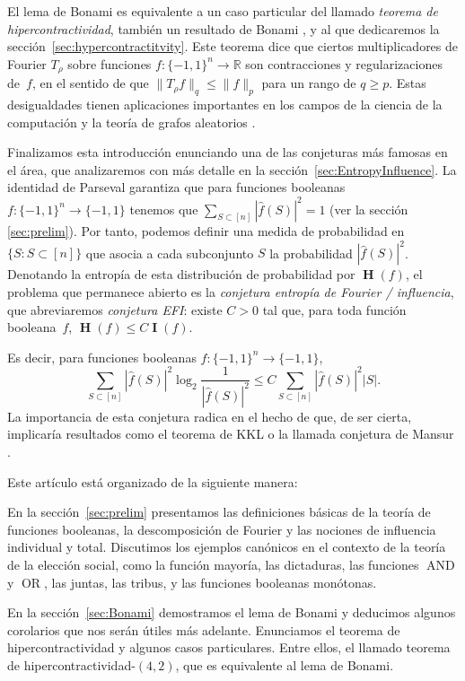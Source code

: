 \documentclass[autocontact]{gaceta}
\newcommand{\R}{\mathbb{R}}
\DeclareMathOperator{\II}{\mathbf{I}}
\DeclareMathOperator{\HH}{\mathbf{H}}
\DeclareMathOperator{\AND}{AND}
\DeclareMathOperator{\OR}{OR}
\begin{document}
El lema de Bonami es equivalente a un caso particular del llamado \emph{teorema de hipercontractividad}, también un resultado de Bonami \cite[capítulo III, teorema~3]{Bon70}, y al que dedicaremos la sección~\ref{sec:hypercontractitvity}. Este teorema dice que ciertos multiplicadores de Fourier $T_\rho$ sobre funciones $f:\{-1,1\}^n\to\R$ son contracciones y regularizaciones de~$f$, en el sentido de que $\|T_{\rho} f\|_q\leq \|f\|_p$ para un rango de $q\geq p$. Estas desigualdades tienen aplicaciones importantes en los campos de la ciencia de la computación y la teoría de grafos aleatorios \cite{KaS05}.

Finalizamos esta introducción enunciando una de las conjeturas más famosas en el área, que analizaremos con más detalle en la sección~\ref{sec:EntropyInfluence}. La identidad de Parseval garantiza que para funciones booleanas $f:\{-1,1\}^n\to \{-1,1\}$ tenemos que $\sum_{S\subset [n]} |\widehat{f}(S)|^2=1$ (ver la sección \ref{sec:prelim}). Por tanto, podemos definir una medida de probabilidad en $\{S:S\subset [n]\}$ que asocia a cada subconjunto $S$ la probabilidad $|\widehat{f}(S)|^2$. Denotando la entropía de esta distribución de probabilidad por $\HH(f)$, el problema que permanece abierto es la \emph{conjetura entropía de Fourier / influencia}, que abreviaremos \emph{conjetura EFI}: existe $C>0$ tal que, para toda función booleana~$f$, $\HH(f)\leq C \II(f)$.

Es decir, para funciones booleanas $f:\{-1,1\}^n\to\{-1,1\}$,
\[
\sum_{S\subset [n]} |\widehat{f}(S)|^2\log_2 \frac{1}{|\widehat{f}(S)|^2}
\leq C \sum_{S\subset [n]} |\widehat{f}(S)|^2|S|.
\]
La importancia de esta conjetura radica en el hecho de que, de ser cierta, implicaría resultados como el teorema de KKL o la llamada conjetura de Mansur \cite{Kal07}.

Este artículo está organizado de la siguiente manera:

En la sección~\ref{sec:prelim} presentamos las definiciones básicas de la teoría de funciones booleanas, la descomposición de Fourier y las nociones de influencia individual y total. Discutimos los ejemplos canónicos en el contexto de la teoría de la elección social, como la función mayoría, las dictaduras, las funciones $\AND$ y $\OR$, las juntas, las tribus, y las funciones booleanas monótonas.

En la sección~\ref{sec:Bonami} demostramos el lema de Bonami y deducimos algunos corolarios que nos serán útiles más adelante. Enunciamos el teorema de hipercontractividad y algunos casos particulares. Entre ellos, el llamado teorema de hipercontractividad-$(4,2)$, que es equivalente al lema de Bonami.
\end{document}
